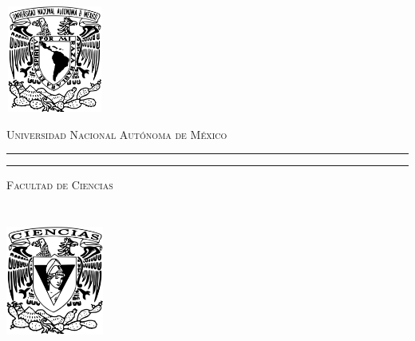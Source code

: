 \begin{titlepage}
	\thispagestyle{empty}
	\begin{minipage}[c][0.17\textheight][c]{0.21\textwidth}
		\begin{center}
			\includegraphics[width=3.2cm, height=3.5cm]{resources/Logo_UNAM.png}
		\end{center}
	\end{minipage}
	\begin{minipage}[c][0.195\textheight][t]{0.75\textwidth}
		\begin{center}
			\vspace{0.3cm}
			\textsc{\large Universidad Nacional Aut\'onoma de M\'exico}\\[0.5cm]
			\vspace{0.3cm}
			\hrule height2.5pt
			\vspace{.2cm}
			\hrule height1pt
			\vspace{.8cm}
			\textsc{Facultad de Ciencias}\\[0.5cm] %
		\end{center}
	\end{minipage}
	
	\begin{minipage}[c][0.81\textheight][t]{0.21\textwidth}
		\vspace*{5mm}
		\begin{center}
			\hskip2.0mm
			\vrule width1pt height13cm 
			\vspace{5mm}
			\hskip2pt
			\vrule width2.5pt height13cm
			\hskip2mm
			\vrule width1pt height13cm \\
			\vspace{5mm}
			\includegraphics[height=4.0cm, width=3.2cm]{resources/Logo_FC.png}
		\end{center}
	\end{minipage}
	\begin{minipage}[c][0.81\textheight][t]{0.75\textwidth}
		\begin{center}
			\vspace{1cm}
			

\end{center}
\end{minipage}
\end{titlepage}
